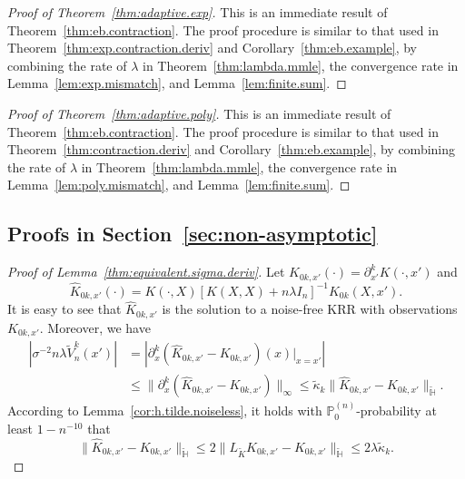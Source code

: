 \documentclass[12pt]{article}
\newcommand{\PP}{\mathbb{P}}
\newcommand{\bbH}{\mathbb{H}}
\theoremstyle{plain}
\theoremstyle{nonitalicremark}
\begin{document}
\begin{appendices}
\begin{proof}[Proof of Theorem~\ref{thm:adaptive.exp}]
This is an immediate result of Theorem~\ref{thm:eb.contraction}. The proof procedure is similar to that used in Theorem~\ref{thm:exp.contraction.deriv} and Corollary~\ref{thm:eb.example}, by combining the rate of $\lambda$ in Theorem~\ref{thm:lambda.mmle}, the convergence rate in Lemma~\ref{lem:exp.mismatch}, and Lemma~\ref{lem:finite.sum}.
\end{proof}


\begin{proof}[Proof of Theorem~\ref{thm:adaptive.poly}]
This is an immediate result of Theorem~\ref{thm:eb.contraction}. The proof procedure is similar to that used in Theorem~\ref{thm:contraction.deriv} and Corollary~\ref{thm:eb.example}, by combining the rate of $\lambda$ in Theorem~\ref{thm:lambda.mmle}, the convergence rate in Lemma~\ref{lem:poly.mismatch}, and Lemma~\ref{lem:finite.sum}.
\end{proof}


\subsection{Proofs in Section~\ref{sec:non-asymptotic}}

\begin{proof}[Proof of Lemma~\ref{thm:equivalent.sigma.deriv}]
Let $K_{0k,x'}(\cdot)=\partial_{x'}^kK(\cdot,x')$ and 
$$\hat{K}_{0k,x'}(\cdot)=K(\cdot, X)[K(X, X) + n \lambda I_n]^{-1} K_{0k}(X, x').$$ 
It is easy to see that $\hat{K}_{0k,x'}$ is the solution to a noise-free KRR with observations $K_{0k,x'}$. Moreover, we have
\begin{equation}\label{eq:tilde.variance}
\begin{split}
|\sigma^{-2}n\lambda\tilde{V}^{k}_{n}(x')| &= \left|\partial^k_{x}(\hat{K}_{0k,x'}-K_{0k,x'})(x)|_{x=x'}\right|\\
&\leq \|\partial^k_{x}(\hat{K}_{0k,x'}-K_{0k,x'})\|_\infty \leq \tilde{\kappa}_{k}
\|\hat{K}_{0k,x'}-K_{0k,x'}\|_{\tilde{\bbH}}.
\end{split}
\end{equation}
According to Lemma~\ref{cor:h.tilde.noiseless}, it holds with $\PP_0^{(n)}$-probability at least $1 - n^{-10}$  that
\begin{equation}
\|\hat{K}_{0k,x'}-K_{0k,x'}\|_{\tilde{\bbH}}\leq 2\|L_{\tilde{K}}K_{0k,x'}-K_{0k,x'}\|_{\tilde{\bbH}} \leq 2\lambda \tilde{\kappa}_{k}.
\end{equation}
\end{proof}



\end{appendices}
\end{document}
